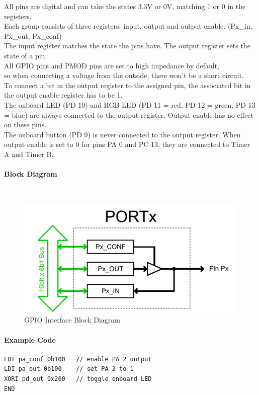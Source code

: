 All pins are digital and can take the states 3.3V or 0V, matching 1 or 0 in the registers.\\
Each group consists of three registers: input, output and output enable. (Px\_in, Px\_out, Px\_conf)\\

The input register matches the state the pins have. The output register sets the state of a pin.\\ 
All GPIO pins and PMOD pins are set to high impedance by default,\\ so when connecting a voltage from the outside, there won't be a short circuit.\\
To connect a bit in the output register to the assigned pin, the associated bit in the output enable register has to be 1.\\

The onboard LED (PD 10) and RGB LED (PD 11 = red, PD 12 = green, PD 13 = blue) are always connected to the output register. Output enable has no effect on these pins.\\
The onboard button (PD 9) is never connected to the output register.
When output enable is set to 0 for pins PA 0 and PC 13, they are connected to Timer A and Timer B. 
\newpage


\paragraph{Block Diagram}~\\
\begin{figure}[h]
    \begin{center}
        \includegraphics[scale=0.3]{assets/GPIO.png}
    \end{center}
    \caption{GPIO Interface Block Diagram}
\end{figure}
\paragraph{Example Code}
\begin{mdframed}[backgroundcolor=light-gray, roundcorner=10pt,leftmargin=1, rightmargin=1, innerleftmargin=15, innertopmargin=6,innerbottommargin=6, outerlinewidth=1, linecolor=light-gray]
\begin{lstlisting}[style=hasm]
LDI pa_conf 0b100   // enable PA 2 output
LDI pa_out 0b100    // set PA 2 to 1
XORI pd_out 0x200   // toggle onboard LED 
END
\end{lstlisting}
\end{mdframed}


